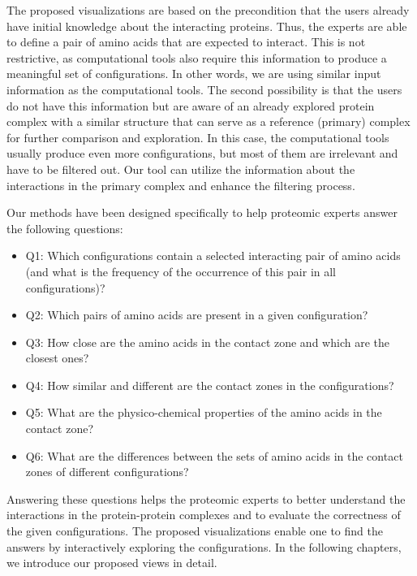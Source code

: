 \documentclass{bmcart}
\begin{document}
The proposed visualizations are based on the precondition that the users already have initial knowledge about the interacting proteins.
Thus, the experts are able to define a pair of amino acids that are expected to interact.
This is not restrictive, as computational tools also require this information to produce a meaningful set of configurations. 
In other words, we are using similar input information as the computational tools.
The second possibility is that the users do not have this information but are aware of an already explored protein complex with a similar structure that can serve as a reference (primary) complex for further comparison and exploration. 
In this case, the computational tools usually produce even more configurations, but most of them are irrelevant and have to be filtered out. 
Our tool can utilize the information about the interactions in the primary complex and enhance the filtering process.

Our methods have been designed specifically to help proteomic experts answer the following questions:
\begin{itemize}
\item Q1: Which configurations contain a selected interacting pair of amino acids (and what is the frequency of the occurrence of this pair in all configurations)?
\item Q2: Which pairs of amino acids are present in a given configuration?
\item Q3: How close are the amino acids in the contact zone and which are the closest ones?
\item Q4: How similar and different are the contact zones in the configurations?
\item Q5: What are the physico-chemical properties of the amino acids in the contact zone?
\item Q6: What are the differences between the sets of amino acids in the contact zones of different configurations?
\end{itemize}

Answering these questions helps the proteomic experts to better understand the interactions in the protein-protein complexes and to evaluate the correctness of the given configurations.
The proposed visualizations enable one to find the answers by interactively exploring the configurations.
In the following chapters, we introduce our proposed views in detail.

\end{document}

